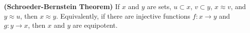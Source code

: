 \textbf{(Schroeder-Bernstein Theorem)} If $x$ and $y$ are sets, $u \subset x$, $v \subset y$, $x \approx v$, and $y \approx u$, then $x \approx y$. Equivalently, if there are injective functions $f: x \to y$ and $g: y \to x$, then $x$ and $y$ are equipotent.
